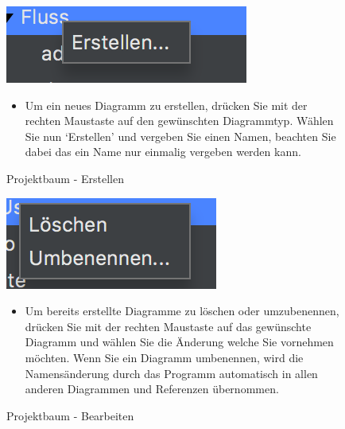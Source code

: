 \begin{figure}[h!]
	\centering
	\includegraphics[width=.4\textwidth]{Projektbaum_Erstellen.png}
	\caption{Projektbaum - Erstellen}
\begin{itemize}
\item Um ein neues Diagramm zu erstellen, drücken Sie mit der rechten Maustaste auf den gewünschten Diagrammtyp. Wählen Sie nun ‘Erstellen' und vergeben Sie einen Namen, beachten Sie dabei das ein Name nur einmalig vergeben werden kann. 
\end{itemize}
\end{figure}



\begin{figure}[h!]
	\centering
	\includegraphics[width=.4\textwidth]{Projektbaum_Bearbeiten.png}
	\caption{Projektbaum - Bearbeiten}
\begin{itemize}	
\item Um bereits erstellte Diagramme zu löschen oder umzubenennen, drücken Sie mit der rechten Maustaste auf das gewünschte Diagramm und wählen Sie die Änderung welche Sie vornehmen möchten. Wenn Sie ein Diagramm umbenennen, wird die Namensänderung durch das Programm automatisch in allen anderen Diagrammen und Referenzen übernommen.
\end{itemize}
\end{figure}


